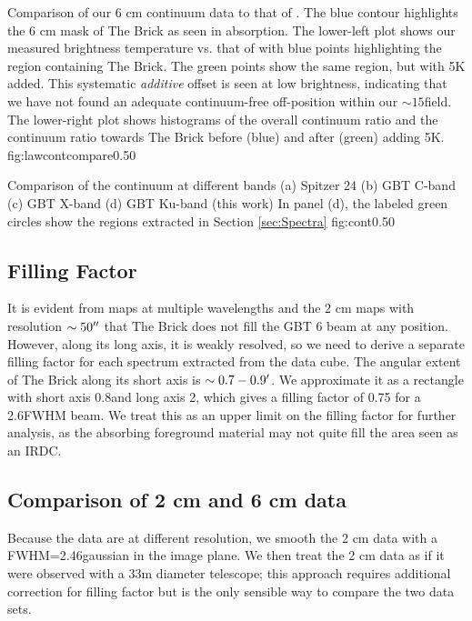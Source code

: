 {Comparison of our 6 cm continuum data to that of \citet{Law2008a}.  The blue
contour highlights the 6 cm mask of The Brick as seen in \formaldehyde
absorption.  The lower-left plot shows our measured brightness temperature vs.
that of \citet{Law2008a} with blue points highlighting the region containing
The Brick.  The green points show the same region, but with 5K added.
This systematic \emph{additive} offset is seen at low brightness,
indicating that we have not found an adequate continuum-free off-position
within our $\sim15$\arcmin field.  The lower-right plot shows histograms of the
overall continuum ratio and the continuum ratio towards The Brick before (blue)
and after (green) adding 5K.
}{fig:lawcontcompare}{0.5}{0}

{Comparison of the continuum at different bands
(a) Spitzer 24 \um \citep{Yusef-Zadeh2009a}
(b) GBT C-band \citep{Law2008a}
(c) GBT X-band \citep{Law2008a}
(d) GBT Ku-band (this work)
In panel (d), the labeled green circles show the regions extracted in Section \ref{sec:Spectra}
}{fig:cont}{0.5}{0}


\subsection{Filling Factor}
\label{sec:fillingfactor}
It is evident from maps at multiple wavelengths and the 2 cm \formaldehyde maps
with resolution $\sim50\mbox{$^{\prime\prime}$}$ that The Brick does not fill the GBT 6 beam at
any position.  However, along its long axis, it is weakly resolved, so we need
to derive a separate filling factor for each spectrum extracted from the data
cube.  The angular extent of The Brick along its short axis is $\sim0.7-0.9
\mbox{$^\prime$}$.  We approximate it as a rectangle with short axis 0.8\arcmin and long
axis 2\arcmin, which gives a filling factor of 0.75 for a 2.6\arcmin FWHM beam.
We treat this as an upper limit on the filling factor for further analysis, as
the absorbing foreground material may not quite fill the area seen as an IRDC.

\subsection{Comparison of 2 cm and 6 cm data}
Because the data are at different resolution, we smooth the 2 cm data with a
FWHM=2.46\arcmin gaussian in the image plane.  We then treat the 2 cm data as
if it were observed with a 33m diameter telescope; this approach requires
additional correction for filling factor but is the only sensible way to
compare the two data sets.


